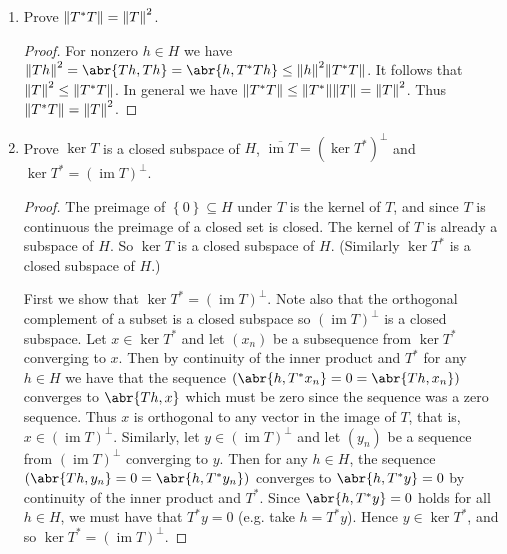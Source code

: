 \documentclass[11pt]{article}
\newcommand{\cbr}[1]{\left\{#1\right\}}
\DeclareMathOperator{\im}{im}
\begin{document}
\begin{enumerate}
\begin{enumerate}
\begin{proof}
        The vector $S^\ast h$ is the unique vector satisfying $\lambda_{S,h}(f) = \abr{Sf,h} = \abr{f,S^\ast h}$ for all $f\in H$. Similarly, the vector $T^\ast h$ is the unique vector satisfying $\lambda_{T,h}(f) = \abr{Tf,h} = \abr{f,T^\ast h}$ for all $f\in H$. Then for all $f\in H$ and $a\in\mathbb{C}$, we have $\abr{(aS+T)f,h} = a\abr{f,S^\ast h} + \abr{f,T^\ast h} = \abr{f,\overline{a}S^\ast h + T^\ast h}$ for all $f\in H$. It follows by uniqueness of the adjoint that $(aS+T)^\ast = \overline{a}S^\ast + T^\ast$ for all $a\in \mathbb{C}$ and $S,T\in B(H)$.

        For all $f,h\in H$ we have $\abr{f,Th} = \overline{\abr{Th,f}} = \overline{\abr{h,T^\ast f}} = \abr{T^\ast f, h} = \abr{f,T^{\ast\ast}h}$. By uniqueness it follows that $T^{\ast\ast} = T$.
      \end{proof}
      \item Prove $\norm{T^\ast T} = \norm{T}^2$. \begin{proof}
        For nonzero $h\in H$ we have $\norm{Th}^2 = \abr{Th,Th} = \abr{h,T^\ast T h}\leq \norm{h}^2\norm{T^\ast T}$. It follows that $\norm{T}^2\leq \norm{T^\ast T}$. In general we have $\norm{T^\ast T}\leq \norm{T^\ast}\norm{T} = \norm{T}^2$. Thus $\norm{T^\ast T} = \norm{T}^2$.
      \end{proof}
      \item Prove $\ker T$ is a closed subspace of $H$, $\overline{\im T} = (\ker T^\ast)^\perp$ and $\ker T^\ast = (\im T)^\perp$. \begin{proof}
        The preimage of $\cbr{0}\subseteq H$ under $T$ is the kernel of $T$, and since $T$ is continuous the preimage of a closed set is closed. The kernel of $T$ is already a subspace of $H$. So $\ker T$ is a closed subspace of $H$. (Similarly $\ker T^\ast$ is a closed subspace of $H$.)

        First we show that $\ker T^\ast = (\im T)^\perp$. Note also that the orthogonal complement of a subset is a closed subspace so $(\im T)^\perp$ is a closed subspace. Let $x\in \ker T^\ast$ and let $(x_n)$ be a subsequence from $\ker T^\ast$ converging to $x$. Then by continuity of the inner product and $T^\ast$ for any $h\in H$ we have that the sequence $(\abr{h,T^\ast x_n} = 0 = \abr{Th,x_n})$ converges to $\abr{Th,x}$ which must be zero since the sequence was a zero sequence. Thus $x$ is orthogonal to any vector in the image of $T$, that is, $x\in (\im T)^\perp$. Similarly, let $y\in (\im T)^\perp$ and let $(y_n)$ be a sequence from $(\im T)^\perp$ converging to $y$. Then for any $h\in H$, the sequence $(\abr{Th, y_n} = 0 = \abr{h,T^\ast y_n})$ converges to $\abr{h,T^\ast y} = 0$ by continuity of the inner product and $T^\ast$. Since $\abr{h,T^\ast y} = 0$ holds for all $h\in H$, we must have that $T^\ast y = 0$ (e.g. take $h = T^\ast y$). Hence $y\in \ker T^\ast$, and so $\ker T^\ast = (\im T)^\perp$. 


\end{proof}
\end{enumerate}
\end{enumerate}
\end{document}
